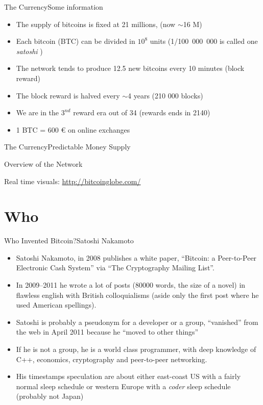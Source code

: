 \documentclass[english,compress]{beamer}
\newcommand{\challenge}{\pgfuseimage{challenge}}
\begin{document}
\begin{frame}{The Currency}{Some information}
 \begin{itemize}
  \item The supply of bitcoins is fixed at 21 millions, (now $\sim$16 M)
  \item Each bitcoin (BTC) can be divided in $10^8$ units (\mbox{1/100 000 000} is called one \emph{satoshi} )
  \item The network tends to produce 12.5 new bitcoins every 10 minutes (block reward)
  \item The block reward is halved every $\sim$4 years (210 000 blocks)
  \item We are in the $3^{nd}$ reward era out of 34 (rewards ends in 2140)
  \item 1 BTC = 600 € on online exchanges
 \end{itemize}

\end{frame}

\begin{frame}{The Currency}{Predictable Money Supply}
\end{frame}

\begin{frame}{Overview of the Network}


\begin{scriptsize}Real time visuals: \url{http://bitcoinglobe.com/}\end{scriptsize}
\end{frame}

\section{Who}

\begin{frame}{Who Invented Bitcoin?}{Satoshi Nakamoto}

\begin{scriptsize}\begin{itemize}
\item Satoshi Nakamoto, in 2008 publishes a white paper, ``Bitcoin: a Peer-to-Peer Electronic Cash System'' via ``The Cryptography Mailing List''.
 \item In 2009--2011 he wrote a lot of posts (80000 words, the size of a novel) in flawless english with British colloquialisms (aside only the first post where he used American spellings).
 \item Satoshi is probably a pseudonym for a developer or a group, “vanished” from the web in April 2011 because he “moved to other things” 
 \item If he is not a group, he is a world class programmer, with deep knowledge of C++, economics, cryptography and peer-to-peer networking.
 \item His timestamps speculation are about either east-coast US with a fairly normal sleep schedule or western Europe with a \emph{coder} sleep schedule (probably not Japan)
\end{itemize}\end{scriptsize}

\challenge
\end{frame}
\end{document}
